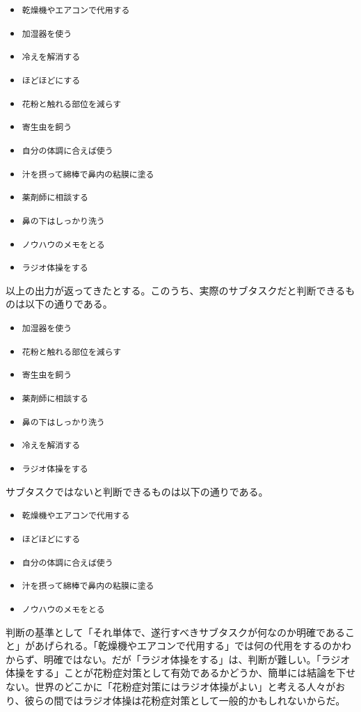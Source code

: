 \documentclass[submit,techreq]{ipsj}
\def\|{\verb|}
\begin{document}
\begin{itemize}
\item \|乾燥機やエアコンで代用する|
\item \|加湿器を使う|
\item \|冷えを解消する|
\item \|ほどほどにする|
\item \|花粉と触れる部位を減らす|
\item \|寄生虫を飼う|
\item \|自分の体調に合えば使う|
\item \|汁を摂って綿棒で鼻内の粘膜に塗る|
\item \|薬剤師に相談する|
\item \|鼻の下はしっかり洗う|
\item \|ノウハウのメモをとる|
\item \|ラジオ体操をする|
\end{itemize}

以上の出力が返ってきたとする。このうち、実際のサブタスクだと判断できるものは以下の通りである。

\begin{itemize}
\item \|加湿器を使う|
\item \|花粉と触れる部位を減らす|
\item \|寄生虫を飼う|
\item \|薬剤師に相談する|
\item \|鼻の下はしっかり洗う|
\item \|冷えを解消する|
\item \|ラジオ体操をする|
\end{itemize}


サブタスクではないと判断できるものは以下の通りである。

\begin{itemize}
\item \|乾燥機やエアコンで代用する|
\item \|ほどほどにする|
\item \|自分の体調に合えば使う|
\item \|汁を摂って綿棒で鼻内の粘膜に塗る|
\item \|ノウハウのメモをとる|
\end{itemize}


判断の基準として「それ単体で、遂行すべきサブタスクが何なのか明確であること」があげられる。「乾燥機やエアコンで代用する」では何の代用をするのかわからず、明確ではない。だが「ラジオ体操をする」は、判断が難しい。「ラジオ体操をする」ことが花粉症対策として有効であるかどうか、簡単には結論を下せない。世界のどこかに「花粉症対策にはラジオ体操がよい」と考える人々がおり、彼らの間ではラジオ体操は花粉症対策として一般的かもしれないからだ。
\end{document}
